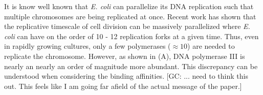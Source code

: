 It is know well known that \textit{E. coli} can parallelize its DNA
replication such that multiple chromosomes are being replicated at once.
Recent work \citep{si2017} has shown that the replicative timescale of cell
division can be massively parallelized where \textit{E. coli} can have on the
order of 10 - 12 replication forks at a given time. Thus, even in rapidly
growing cultures, only a few polymerases ($\approx 10$) are needed to
replicate the chromosome. However, as shown in (A), DNA
polymerase III is nearly an nearly an order of magnitude more abundant. This
discrepancy can be understood when considering the binding affinities. [GC:
... need to think this out. This feels like I am going far afield of the
actual message of the paper.]
